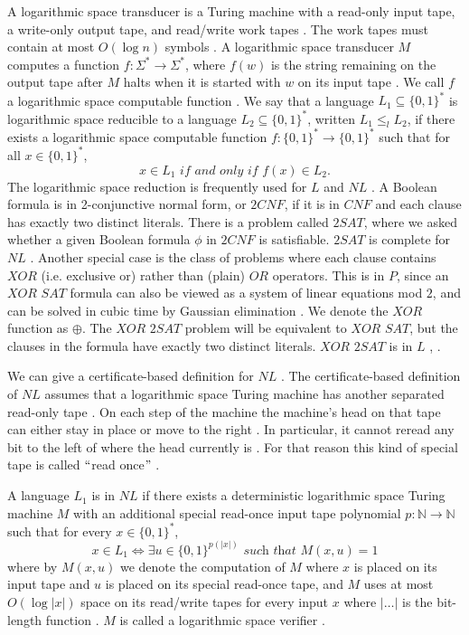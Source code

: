 \documentclass[a4paper,UKenglish,cleveref, autoref]{lipics-v2019}
\begin{document}
A logarithmic space transducer is a Turing machine with a read-only input tape, a write-only output tape, and read/write work tapes \cite{MS06}. The work tapes must contain at most $O(\log n)$ symbols \cite{MS06}. A logarithmic space transducer $M$ computes a function $f : \Sigma^{*} \rightarrow \Sigma^{*}$, where $f(w)$ is the string remaining on the output tape after $M$ halts when it is started with $w$ on its input tape \cite{MS06}. We call $f$ a logarithmic space computable function \cite{MS06}. We say that a language $L_{1} \subseteq \{0, 1\}^{*}$ is logarithmic space reducible to a language $L_{2} \subseteq \{0, 1\}^{*}$, written $L_{1} \leq_{l} L_{2}$, if there exists a logarithmic space computable function $f : \{0, 1\}^{*} \rightarrow \{0, 1\}^{*}$ such that for all $x \in \{0, 1\}^{*}$,
\[x \in L_{1} \textit{ if and only if } f(x) \in L_{2}.\]
The logarithmic space reduction is frequently used for $L$ and $NL$ \cite{Pap03}. A Boolean formula is in 2-conjunctive normal form, or $2CNF$, if it is in $CNF$ and each clause has exactly two distinct literals. There is a problem called $2SAT$, where we asked whether a given Boolean formula $\phi$ in $2CNF$ is satisfiable. $2SAT$ is complete for $NL$ \cite{Pap03}. Another special case is the class of problems where each clause contains $XOR$ (i.e. exclusive or) rather than (plain) $OR$ operators. This is in $P$, since an $\textit{XOR SAT}$ formula can also be viewed as a system of linear equations mod $2$, and can be solved in cubic time by Gaussian elimination \cite{MM11}. We denote the $XOR$ function as $\oplus$. The $\textit{XOR 2SAT}$ problem will be equivalent to $\textit{XOR SAT}$, but the clauses in the formula have exactly two distinct literals. $\textit{XOR 2SAT}$ is in $L$ \cite{AR00}, \cite{RM08}.

We can give a certificate-based definition for $NL$ \cite{AB09}. The certificate-based definition of $NL$ assumes that a logarithmic space Turing machine has another separated read-only tape \cite{AB09}. On each step of the machine the machine's head on that tape can either stay in place or move to the right \cite{AB09}. In particular, it cannot reread any bit to the left of where the head currently is \cite{AB09}. For that reason this kind of special tape is called $``$read once$"$ \cite{AB09}.

\begin{definition}
A language $L_{1}$ is in $NL$ if there exists a deterministic logarithmic space Turing machine $M$ with an additional special read-once input tape polynomial $p: \mathbb{N} \rightarrow \mathbb{N}$ such that for every $x \in \{0, 1\}^{*}$,
\[x \in L_{1} \Leftrightarrow \exists u \in \{0, 1\}^{p(|x|)} \textit{ such that } M(x, u) = 1 \]
where by $M(x, u)$ we denote the computation of $M$ where $x$ is placed on its input tape and $u$ is placed on its special read-once tape, and $M$ uses at most $O(\log |x|)$ space on its read/write tapes for every input $x$ where $|\ldots|$ is the bit-length function \cite{AB09}. $M$ is called a logarithmic space verifier \cite{AB09}.
\end{definition}
\end{document}
